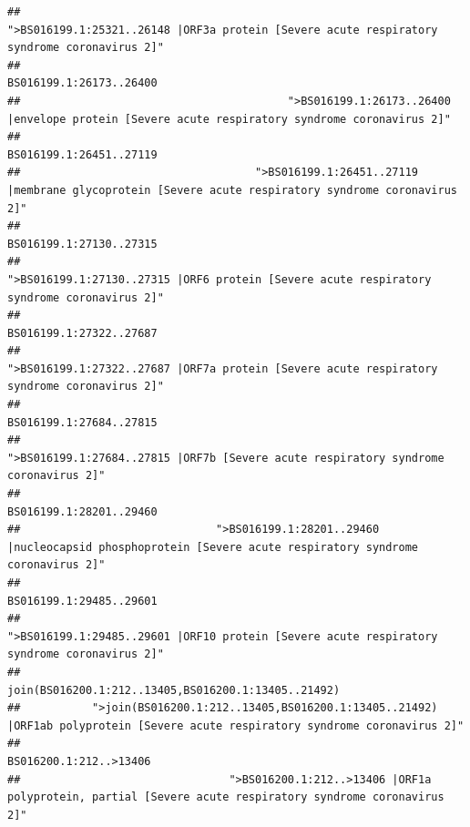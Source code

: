 \documentclass[
]{article}
\begin{document}
\begin{verbatim}
##                                            ">BS016199.1:25321..26148 |ORF3a protein [Severe acute respiratory syndrome coronavirus 2]" 
##                                                                                                                BS016199.1:26173..26400 
##                                         ">BS016199.1:26173..26400 |envelope protein [Severe acute respiratory syndrome coronavirus 2]" 
##                                                                                                                BS016199.1:26451..27119 
##                                    ">BS016199.1:26451..27119 |membrane glycoprotein [Severe acute respiratory syndrome coronavirus 2]" 
##                                                                                                                BS016199.1:27130..27315 
##                                             ">BS016199.1:27130..27315 |ORF6 protein [Severe acute respiratory syndrome coronavirus 2]" 
##                                                                                                                BS016199.1:27322..27687 
##                                            ">BS016199.1:27322..27687 |ORF7a protein [Severe acute respiratory syndrome coronavirus 2]" 
##                                                                                                                BS016199.1:27684..27815 
##                                                    ">BS016199.1:27684..27815 |ORF7b [Severe acute respiratory syndrome coronavirus 2]" 
##                                                                                                                BS016199.1:28201..29460 
##                              ">BS016199.1:28201..29460 |nucleocapsid phosphoprotein [Severe acute respiratory syndrome coronavirus 2]" 
##                                                                                                                BS016199.1:29485..29601 
##                                            ">BS016199.1:29485..29601 |ORF10 protein [Severe acute respiratory syndrome coronavirus 2]" 
##                                                                                    join(BS016200.1:212..13405,BS016200.1:13405..21492) 
##           ">join(BS016200.1:212..13405,BS016200.1:13405..21492) |ORF1ab polyprotein [Severe acute respiratory syndrome coronavirus 2]" 
##                                                                                                                 BS016200.1:212..>13406 
##                                ">BS016200.1:212..>13406 |ORF1a polyprotein, partial [Severe acute respiratory syndrome coronavirus 2]" 

\end{verbatim}
\end{document}
